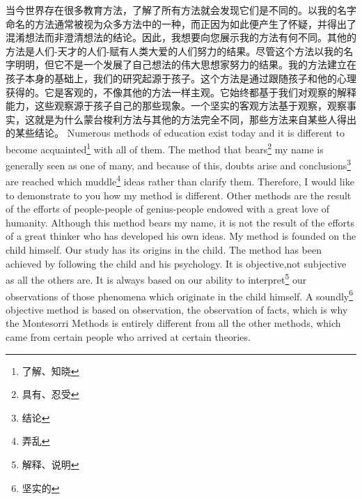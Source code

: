\documentclass[lang=cn,10pt]{elegantbook}
\begin{document}
\begin{tcolorbox}[title=译文,
colback=red!5!white,
colframe=red!75!black,
fonttitle=\bfseries]
当今世界存在很多教育方法，了解了所有方法就会发现它们是不同的。以我的名字命名的方法通常被视为众多方法中的一种，而正因为如此便产生了怀疑，并得出了混淆想法而非澄清想法的结论。因此，我想要向您展示我的方法有何不同。其他的方法是人们-天才的人们-赋有人类大爱的人们努力的结果。尽管这个方法以我的名字明明，但它不是一个发展了自己想法的伟大思想家努力的结果。我的方法建立在孩子本身的基础上，我们的研究起源于孩子。这个方法是通过跟随孩子和他的心理获得的。它是客观的，不像其他的方法一样主观。它始终都基于我们对观察的解释能力，这些观察源于孩子自己的那些现象。一个坚实的客观方法基于观察，观察事实，这就是为什么蒙台梭利方法与其他的方法完全不同，那些方法来自某些人得出的某些结论。
Numerous methods of education exist today and it is different to become acquainted\footnote{了解、知晓} with all of them. The method that bears\footnote{具有、忍受} my name is generally seen as one of many, and because of this, doubts arise and conclusions\footnote{结论} are reached which muddle\footnote{弄乱} ideas rather than clarify them. Therefore, I would like to demonstrate to you how my method is different. Other methods are the result of the efforts of people-people of genius-people endowed with a great love of humanity. Although this method bears my name, it is not the result of the efforts of a great thinker who has developed his own ideas. My method is founded on the child himself. Our study has its origins in the child. The method has been achieved by following the child and his psychology. It is objective,not subjective as all the others are. It is always based on our ability to interpret\footnote{解释、说明} our observations of those phenomena which originate in the child himself. A soundly\footnote{坚实的} objective method is based on observation, the observation of facts, which is why the Montesorri Methods is entirely different from all the other methods, which came from certain people who arrived at certain theories.
\end{tcolorbox}
\end{document}
